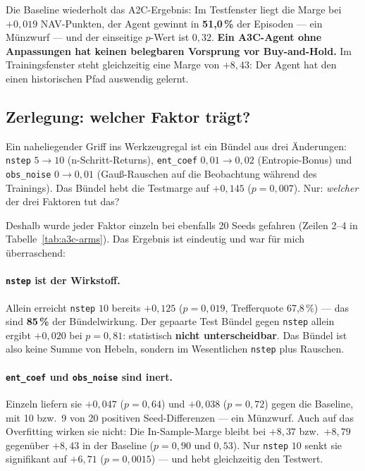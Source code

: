 Die Baseline wiederholt das A2C-Ergebnis: Im Testfenster liegt die Marge bei
$+0{,}019$ NAV-Punkten, der Agent gewinnt in \textbf{51,0\,\%} der Episoden --- ein
Münzwurf --- und der einseitige $p$-Wert ist $0{,}32$. \textbf{Ein A3C-Agent ohne
Anpassungen hat keinen belegbaren Vorsprung vor Buy-and-Hold.} Im Trainingsfenster steht
gleichzeitig eine Marge von $+8{,}43$: Der Agent hat den einen historischen Pfad
auswendig gelernt.

\subsection{Zerlegung: welcher Faktor trägt?}

Ein naheliegender Griff ins Werkzeugregal ist ein Bündel aus drei Änderungen:
\texttt{nstep} $5\to10$ (n-Schritt-Returns), \texttt{ent\_coef} $0{,}01\to0{,}02$
(Entropie-Bonus) und \texttt{obs\_noise} $0\to0{,}01$ (Gauß-Rauschen auf die Beobachtung
während des Trainings). Das Bündel hebt die Testmarge auf $+0{,}145$
($p=0{,}007$). Nur: \emph{welcher} der drei Faktoren tut das?

Deshalb wurde jeder Faktor einzeln bei ebenfalls 20 Seeds gefahren (Zeilen 2--4 in
Tabelle~\ref{tab:a3c-arms}). Das Ergebnis ist eindeutig und war für mich überraschend:

\paragraph{\texttt{nstep} ist der Wirkstoff.} Allein erreicht \texttt{nstep} $10$
bereits $+0{,}125$ ($p=0{,}019$, Trefferquote 67,8\,\%) --- das sind \textbf{85\,\%} der
Bündelwirkung. Der gepaarte Test Bündel gegen \texttt{nstep} allein ergibt
$+0{,}020$ bei $p=0{,}81$: statistisch \textbf{nicht unterscheidbar}. Das Bündel ist
also keine Summe von Hebeln, sondern im Wesentlichen \texttt{nstep} plus Rauschen.

\paragraph{\texttt{ent\_coef} und \texttt{obs\_noise} sind inert.} Einzeln liefern sie
$+0{,}047$ ($p=0{,}64$) und $+0{,}038$ ($p=0{,}72$) gegen die Baseline, mit
10 bzw.\ 9 von 20 positiven Seed-Differenzen --- ein Münzwurf. Auch auf das Overfitting
wirken sie nicht: Die In-Sample-Marge bleibt bei $+8{,}37$ bzw.\ $+8{,}79$ gegenüber
$+8{,}43$ in der Baseline ($p=0{,}90$ und $0{,}53$). Nur \texttt{nstep} $10$ senkt sie
signifikant auf $+6{,}71$ ($p=0{,}0015$) --- und hebt gleichzeitig den Testwert.

